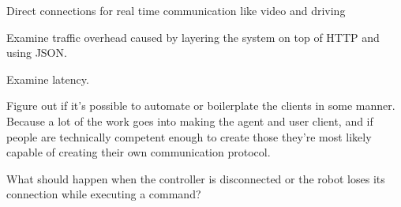 Direct connections for real time communication like video and driving

Examine traffic overhead caused by layering the system on top of HTTP and using JSON.

Examine latency.

Figure out if it's possible to automate or boilerplate the clients in some manner.
Because a lot of the work goes into making the agent and user client, and if people are technically competent enough to create those they're most likely capable of creating their own communication protocol.

What should happen when the controller is disconnected or the robot loses its connection while executing a command?
